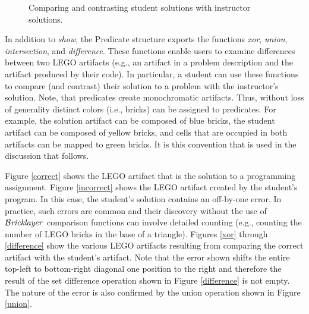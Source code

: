 \documentclass[submission,copyright,creativecommons]{eptcs}
\newcommand{\bricklayer}{\ensuremath{\mathcal{B}\emph{ricklayer}}}
\begin{document}
\begin{figure*}[htb!]
\centering
{}



\caption{Comparing and contrasting student solutions with instructor solutions.}\label{fig-predicate-comparisons}
\end{figure*}

In addition to \emph{show}, the Predicate structure exports the functions \emph{xor}, \emph{union}, \emph{intersection},  and \emph{difference}. These functions enable users to examine differences between two LEGO artifacts (e.g., an artifact in a problem description and the artifact produced by their code). In particular, a student can use these functions to compare (and contrast) their solution to a problem with the instructor's solution. Note, that predicates create monochromatic artifacts. Thus, without loss of generality distinct colors (i.e., bricks) can be assigned to predicates. For example, the solution artifact can be composed of blue bricks, the student artifact can be composed of yellow bricks, and cells that are occupied in both artifacts can be mapped to green bricks. It is this convention that is used in the discussion that follows.

Figure \ref{correct} shows the LEGO artifact that is the solution to a programming assignment. Figure \ref{incorrect} shows the LEGO artifact created by the student's program. In this case, the student's solution contains an off-by-one error. In practice, such errors are common and their discovery without the use of \bricklayer\ comparison functions can involve detailed counting (e.g., counting the number of LEGO bricks in the base of a triangle). Figures \ref{xor} through \ref{difference} show the various LEGO artifacts resulting from comparing the correct artifact with the student's artifact. Note that the error shown shifts the entire top-left to bottom-right diagonal one position to the right and therefore the result of the set difference operation shown in Figure \ref{difference} is not empty. The nature of the error is also confirmed by the union operation shown in Figure \ref{union}.
\end{document}
